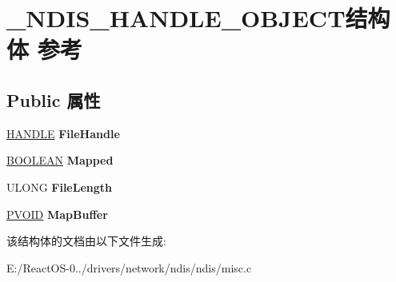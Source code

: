 \hypertarget{struct___n_d_i_s___h_a_n_d_l_e___o_b_j_e_c_t}{}\section{\+\_\+\+N\+D\+I\+S\+\_\+\+H\+A\+N\+D\+L\+E\+\_\+\+O\+B\+J\+E\+C\+T结构体 参考}
\label{struct___n_d_i_s___h_a_n_d_l_e___o_b_j_e_c_t}
\subsection*{Public 属性}
\begin{DoxyCompactItemize}
\item 
\mbox{\label{struct___n_d_i_s___h_a_n_d_l_e___o_b_j_e_c_t_a675f043e749180409622280d548c8811}} 
\hyperlink{interfacevoid}{H\+A\+N\+D\+LE} {\bfseries File\+Handle}
\item 
\mbox{\label{struct___n_d_i_s___h_a_n_d_l_e___o_b_j_e_c_t_a6a9486be259b34778e76986f9dd1a733}} 
\hyperlink{_processor_bind_8h_a112e3146cb38b6ee95e64d85842e380a}{B\+O\+O\+L\+E\+AN} {\bfseries Mapped}
\item 
\mbox{\label{struct___n_d_i_s___h_a_n_d_l_e___o_b_j_e_c_t_ae6f2217749bc837abf43e7a33868b48c}} 
U\+L\+O\+NG {\bfseries File\+Length}
\item 
\mbox{\label{struct___n_d_i_s___h_a_n_d_l_e___o_b_j_e_c_t_a8e6f30e55ccee4998f125204042dbaf0}} 
\hyperlink{interfacevoid}{P\+V\+O\+ID} {\bfseries Map\+Buffer}
\end{DoxyCompactItemize}


该结构体的文档由以下文件生成\+:\begin{DoxyCompactItemize}
\item 
E\+:/\+React\+O\+S-\/0../drivers/network/ndis/ndis/misc.\+c\end{DoxyCompactItemize}

